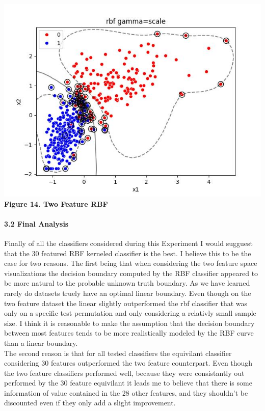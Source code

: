 \documentclass[11pt]{article}
\begin{document}
\includegraphics{figures/3_2_3_rbf.jpg}\\
\textbf{Figure 14. Two Feature RBF}

\hypertarget{final-analysis}{%
\paragraph{3.2 Final Analysis}\label{final-analysis}}

Finally of all the classifiers considered during this Experiment I would
sugguest that the 30 featured RBF kerneled classifier is the best. I
believe this to be the case for two reasons. The first being that when
considering the two feature space visualizations the decision boundary
computed by the RBF classifier appeared to be more natural to the
probable unknown truth boundary. As we have learned rarely do datasets
truely have an optimal linear boundary. Even though on the two feature
dataset the linear slightly outperformed the rbf classifier that was
only on a specific test permutation and only considering a relativly
small sample size. I think it is reasonable to make the assumption that
the decision boundary between most features tends to be more
realistically modeled by the RBF curve than a linear boundary.\\
The second reason is that for all tested classifiers the equivilant
classifier considering 30 features outperformed the two feature
counterpart. Even though the two feature classifiers performed well,
because they were consistantly out performed by the 30 feature
equivilant it leads me to believe that there is some information of
value contained in the 28 other features, and they shouldn't be
discounted even if they only add a slight improvement.


    
    
    
\end{document}
